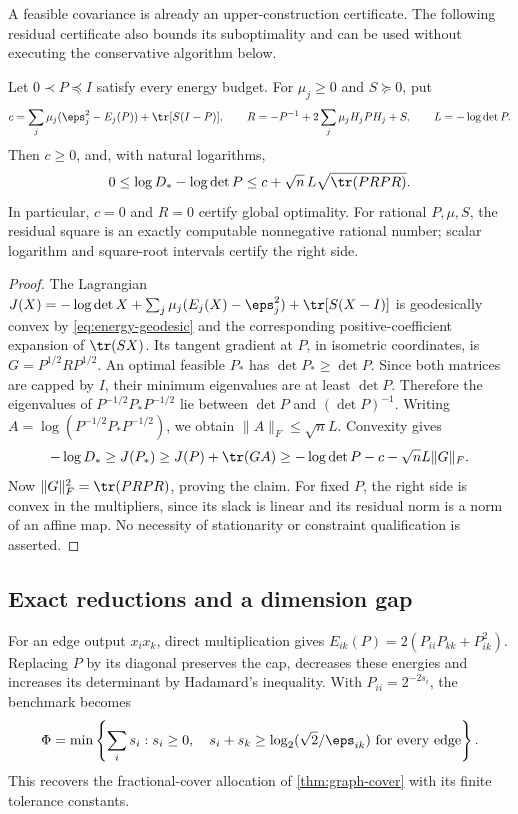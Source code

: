 A feasible covariance is already an upper-construction certificate.
The following residual certificate also bounds its suboptimality and can
be used without executing the conservative algorithm below.
\begin{proposition}\label{prop:covariance-certificate}
Let $0\prec P\preceq I$ satisfy every energy budget. For $\mu_j\ge0$
and $S\succeq0$, put
\[
 c=\sum_j\mu_j(\eps_j^2-E_j(P))+\tr[S(I-P)],\qquad
 R=-P^{-1}+2\sum_j\mu_jH_jPH_j+S,\qquad L=-\log\det P.
\]
Then $c\ge0$, and, with natural logarithms,
\begin{equation}\label{eq:covariance-certificate}
 0\le\log D_* -\log\det P
 \le c+\sqrt n\,L\sqrt{\tr(PRPR)}.
\end{equation}
In particular, $c=0$ and $R=0$ certify global optimality. For rational
$P,\mu,S$, the residual square is an exactly computable nonnegative
rational number; scalar logarithm and square-root intervals certify the
right side.
\end{proposition}
\begin{proof}
The Lagrangian
$J(X)=-\log\det X+\sum_j\mu_j(E_j(X)-\eps_j^2)+\tr[S(X-I)]$
is geodesically convex by \eqref{eq:energy-geodesic} and the corresponding
positive-coefficient expansion of $\tr(SX)$. Its tangent gradient at $P$,
in isometric coordinates, is $G=P^{1/2}RP^{1/2}$. An optimal feasible
$P_*$ has $\det P_*\ge\det P$. Since both matrices are capped by $I$,
their minimum eigenvalues are at least $\det P$. Therefore the eigenvalues
of $P^{-1/2}P_*P^{-1/2}$ lie between $\det P$ and $(\det P)^{-1}$.
Writing $A=\log(P^{-1/2}P_*P^{-1/2})$, we obtain
$\|A\|_F\le\sqrt nL$. Convexity gives
\[
 -\log D_*\ge J(P_*)\ge J(P)+\tr(GA)
 \ge-\log\det P-c-\sqrt nL\|G\|_F.
\]
Now $\|G\|_F^2=\tr(PRPR)$, proving the claim. For fixed $P$, the
right side is convex in the multipliers, since its slack is linear and
its residual norm is a norm of an affine map. No necessity of stationarity
or constraint qualification is asserted.
\end{proof}

\subsection{Exact reductions and a dimension gap}

For an edge output $x_ix_k$, direct multiplication gives
$E_{ik}(P)=2(P_{ii}P_{kk}+P_{ik}^2)$. Replacing $P$ by its diagonal
preserves the cap, decreases these energies and increases its determinant
by Hadamard's inequality. With $P_{ii}=2^{-2s_i}$, the benchmark becomes
\begin{equation}\label{eq:covariance-graph-lp}
 \Phi=\min\left\{\sum_i s_i:s_i\ge0,\quad
 s_i+s_k\ge\log_2(\sqrt2/\eps_{ik})\text{ for every edge}\right\}.
\end{equation}
This recovers the fractional-cover allocation of \cref{thm:graph-cover}
with its finite tolerance constants.

